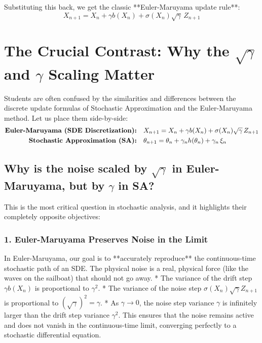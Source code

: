 \documentclass[11pt]{article}
\begin{document}
Substituting this back, we get the classic **Euler-Maruyama update rule**:
\begin{equation}
    X_{n+1} = X_n + \gamma b(X_n) + \sigma(X_n) \sqrt{\gamma} \, Z_{n+1}
\end{equation}

\section{The Crucial Contrast: Why the $\sqrt{\gamma}$ and $\gamma$ Scaling Matter}

Students are often confused by the similarities and differences between the discrete update formulas of Stochastic Approximation and the Euler-Maruyama method. Let us place them side-by-side:
\begin{align}
    \text{\textbf{Euler-Maruyama (SDE Discretization):}} \quad &X_{n+1} = X_n + \gamma b(X_n) + \sigma(X_n) \sqrt{\gamma} \, Z_{n+1} \label{eq:em_formula} \\
    \text{\textbf{Stochastic Approximation (SA):}} \quad &\theta_{n+1} = \theta_n + \gamma_n h(\theta_n) + \gamma_n \, \xi_n \label{eq:sa_formula}
\end{align}

\subsection{Why is the noise scaled by $\sqrt{\gamma}$ in Euler-Maruyama, but by $\gamma$ in SA?}
This is the most critical question in stochastic analysis, and it highlights their completely opposite objectives:

\subsubsection{1. Euler-Maruyama Preserves Noise in the Limit}
In Euler-Maruyama, our goal is to **accurately reproduce** the continuous-time stochastic path of an SDE. The physical noise is a real, physical force (like the waves on the sailboat) that should not go away. 
* The variance of the drift step $\gamma b(X_n)$ is proportional to $\gamma^2$.
* The variance of the noise step $\sigma(X_n) \sqrt{\gamma} Z_{n+1}$ is proportional to $(\sqrt{\gamma})^2 = \gamma$.
* As $\gamma \to 0$, the noise step variance $\gamma$ is infinitely larger than the drift step variance $\gamma^2$. This ensures that the noise remains active and does not vanish in the continuous-time limit, converging perfectly to a stochastic differential equation.
\end{document}
